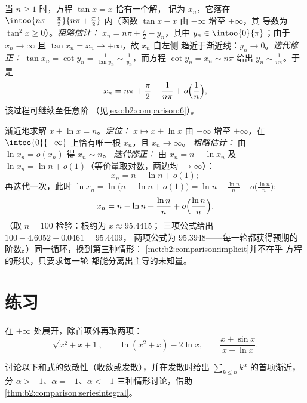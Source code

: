 \begin{example}\label{ex:b2:comparison:tan}
当 $n \geq 1$ 时，方程 $\tan x = x$ 恰有一个解，
记为 $x_n$，它落在 $\intoo{n\pi - \frac\pi2}{n\pi + \frac\pi2}$ 内（函数
$\tan x - x$ 由 $-\infty$ 增至 $+\infty$，其
导数为 $\tan^2 x \geq 0$）。\emph{粗略估计：} $x_n = n\pi +
\frac\pi2 - y_n$，其中 $y_n \in \intoo{0}{\pi}$；由于 $x_n \to
\infty$ 且 $\tan x_n = x_n \to +\infty$，故 $x_n$ 自左侧
趋近于渐近线：$y_n \to 0$。\emph{迭代修正：} $\tan x_n =
\cot y_n = \frac{1}{\tan y_n} \sim \frac{1}{y_n}$，而方程
$\cot y_n = x_n \sim n\pi$ 给出 $y_n \sim \frac{1}{n\pi}$。于是
\[
x_n = n\pi + \frac\pi2 - \frac{1}{n\pi} +
o\Bigl(\frac1n\Bigr),
\]
该过程可继续至任意阶
（见\cref{exo:b2:comparison:6}）。
\end{example}

\begin{example}[方法的第二次应用]\label{ex:b2:comparison:xplusln}
渐近地求解 $x + \ln x = n$。\emph{定位：} $x
\mapsto x + \ln x$ 由 $-\infty$ 增至 $+\infty$，在
$\intoo{0}{+\infty}$ 上恰有唯一根 $x_n$，且 $x_n \to \infty$。
\emph{粗略估计：} 由 $\ln x_n = o(x_n)$ 得 $x_n \sim n$。
\emph{迭代修正：} 由 $x_n = n - \ln x_n$ 及 $\ln x_n = \ln n
+ o(1)$（等价量取对数，两边均 $\to \infty$）：
\[
x_n = n - \ln n + o(1) ;
\]
再迭代一次，此时 $\ln x_n = \ln\bigl(n - \ln n + o(1)\bigr) =
\ln n - \frac{\ln n}{n} + o\bigl(\frac{\ln n}n\bigr)$:
\[
x_n = n - \ln n + \frac{\ln n}{n} +
o\Bigl(\frac{\ln n}{n}\Bigr).
\]
（取 $n = 100$ 检验：根约为 $x \approx 95.4415$；
三项公式给出 $100 - 4.6052 + 0.0461 = 95.4409$，
两项公式为 $95.3948$——每一轮都获得预期的
阶数。）同一循环，换到第三种情形：
\cref{met:b2:comparison:implicit}并不在乎
方程的形状，只要求每一轮
都能分离出主导的未知量。
\end{example}

\section{练习}

\begin{exercise}[$\star$]\label{exo:b2:comparison:1}
在 $+\infty$ 处展开，除首项外再取两项：
\[
\sqrt{x^2 + x + 1} ,
\qquad
\ln(x^2 + x) - 2\ln x,
\qquad
\frac{x + \sin x}{x - \ln x} .
\]
\end{exercise}

\begin{exercise}[$\star$]\label{exo:b2:comparison:2}
讨论以下和式的敛散性（收敛或发散），并在发散时给出
$\sum_{k \leq n} k^\alpha$ 的首项渐近，分 $\alpha >
-1$、$\alpha = -1$、$\alpha < -1$ 三种情形讨论，借助
\cref{thm:b2:comparison:seriesintegral}。
\end{exercise}

